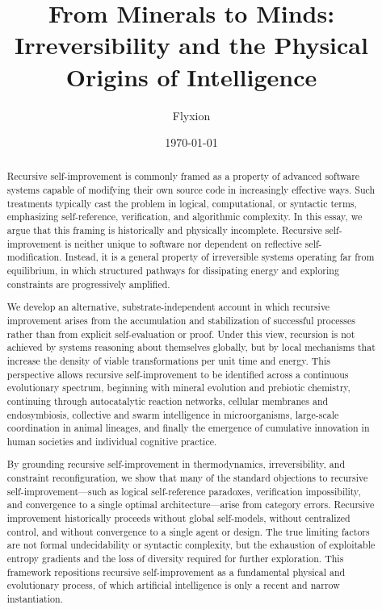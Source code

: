 \documentclass[11pt]{article}
\title{From Minerals to Minds:\\
Irreversibility and the Physical Origins of Intelligence}
\author{Flyxion}
\date{\today}
\begin{document}
\maketitle

\begin{abstract}

Recursive self-improvement is commonly framed as a property of advanced software systems capable of modifying their own source code in increasingly effective ways. Such treatments typically cast the problem in logical, computational, or syntactic terms, emphasizing self-reference, verification, and algorithmic complexity. In this essay, we argue that this framing is historically and physically incomplete. Recursive self-improvement is neither unique to software nor dependent on reflective self-modification. Instead, it is a general property of irreversible systems operating far from equilibrium, in which structured pathways for dissipating energy and exploring constraints are progressively amplified.

We develop an alternative, substrate-independent account in which recursive improvement arises from the accumulation and stabilization of successful processes rather than from explicit self-evaluation or proof. Under this view, recursion is not achieved by systems reasoning about themselves globally, but by local mechanisms that increase the density of viable transformations per unit time and energy. This perspective allows recursive self-improvement to be identified across a continuous evolutionary spectrum, beginning with mineral evolution and prebiotic chemistry, continuing through autocatalytic reaction networks, cellular membranes and endosymbiosis, collective and swarm intelligence in microorganisms, large-scale coordination in animal lineages, and finally the emergence of cumulative innovation in human societies and individual cognitive practice.

By grounding recursive self-improvement in thermodynamics, irreversibility, and constraint reconfiguration, we show that many of the standard objections to recursive self-improvement—such as logical self-reference paradoxes, verification impossibility, and convergence to a single optimal architecture—arise from category errors. Recursive improvement historically proceeds without global self-models, without centralized control, and without convergence to a single agent or design. The true limiting factors are not formal undecidability or syntactic complexity, but the exhaustion of exploitable entropy gradients and the loss of diversity required for further exploration. This framework repositions recursive self-improvement as a fundamental physical and evolutionary process, of which artificial intelligence is only a recent and narrow instantiation.

\end{abstract}
\end{document}
